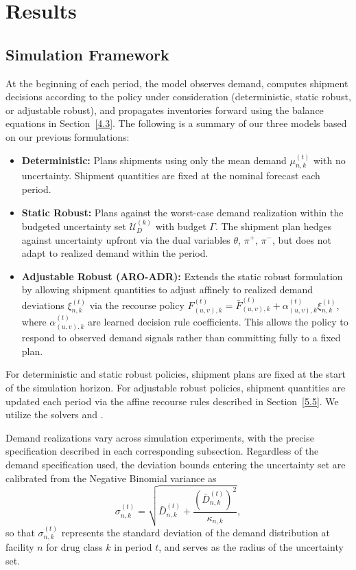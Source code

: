 \documentclass{article}
\begin{document}
\section{Results}

\subsection{Simulation Framework}
\label{5.1}

At the beginning of each period, the model observes demand, computes shipment decisions according to the policy under consideration 
(deterministic, static robust, or adjustable robust), and propagates inventories forward using the balance equations in Section~\ref{4.3}. The following is a summary of our three models based on our previous formulations:

\begin{itemize}
    \item \textbf{Deterministic:} Plans shipments using only the mean demand $\mu_{n,k}^{(t)}$ with no uncertainty. Shipment quantities are fixed at the nominal forecast each period.
    
    \item \textbf{Static Robust:} Plans against the worst-case demand realization within the budgeted uncertainty set $\mathcal{U}_D^{(k)}$ with budget $\Gamma$. The shipment plan hedges against uncertainty upfront via the dual variables $\theta$, $\pi^+$, $\pi^-$, but does not adapt to realized demand within the period.
    
    \item \textbf{Adjustable Robust (ARO-ADR):} Extends the static robust formulation by allowing shipment quantities to adjust affinely to realized demand deviations $\xi_{n,k}^{(t)}$ via the recourse policy $F_{(u,v),k}^{(t)} = \bar{F}_{(u,v),k}^{(t)}  + \alpha_{(u,v),k}^{(t)} \xi_{n,k}^{(t)}$, where $\alpha_{(u,v),k}^{(t)} $ are learned decision rule coefficients. This allows the policy to respond to observed demand signals rather than committing fully to a fixed plan.
\end{itemize}

For deterministic and static robust policies, shipment plans are fixed at the start of the simulation horizon. For adjustable robust policies, shipment quantities are updated each period via the affine recourse rules described in Section~\ref{5.5}. We utilize the solvers \cite{gurobi} and \cite{mosek}.

Demand realizations vary across simulation experiments, with the precise specification described in each corresponding subsection. Regardless of the demand specification used, the deviation bounds entering the uncertainty set are calibrated from the Negative Binomial variance as
\[
    \sigma^{(t)}_{n,k} = \sqrt{\bar{D}^{(t)}_{n,k} + 
    \frac{(\bar{D}^{(t)}_{n,k})^2}{\kappa_{n,k}}},
\]
so that $\sigma^{(t)}_{n,k}$ represents the standard deviation of the demand distribution at facility $n$ for drug class $k$ in period $t$, and serves as the radius of the uncertainty set.
\end{document}
